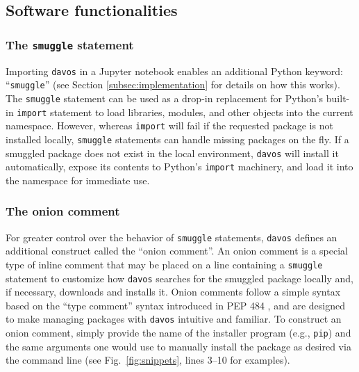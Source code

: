 \documentclass[preprint,12pt,a4paper]{elsarticle}
\newcommand{\comment}[1]{}
\begin{document}
\subsection{Software functionalities}
\subsubsection{The \texttt{smuggle} statement}\label{subsec:smuggle}
Importing \texttt{davos} in a Jupyter notebook enables an additional Python keyword: ``\texttt{smuggle}'' (see Section \ref{subsec:implementation} for details on how this works).
The \texttt{smuggle} statement can be used as a drop-in replacement for Python's built-in \texttt{import} statement to load libraries, modules, and other objects into the current namespace.
However, whereas \texttt{import} will fail if the requested package is not installed locally, \texttt{smuggle} statements can handle missing packages on the fly.
If a smuggled package does not exist in the local environment, \texttt{davos} will install it automatically, expose its contents to Python's \texttt{import} machinery, and load it into the namespace for immediate use.

\subsubsection{The onion comment}\label{subsec:onion}
For greater control over the behavior of \texttt{smuggle} statements, \texttt{davos} defines an additional construct called the ``onion comment''. An onion comment is a special type of inline comment that may be placed on a line containing a \texttt{smuggle} statement to customize how \texttt{davos} searches for the smuggled package locally and, if necessary, downloads and installs it. Onion comments follow a simple syntax based on the ``type comment'' syntax introduced in PEP 484 \cite{vanREtal14}, and are designed to make managing packages with \texttt{davos} intuitive and familiar. To construct an onion comment, simply provide the name of the installer program (e.g., \texttt{pip}) and the same arguments one would use to manually install the package as desired via the command line\comment{(see Fig.~\ref{fig:snippets})} (see Fig.~\ref{fig:snippets}, lines 3--10 for examples).
\end{document}

